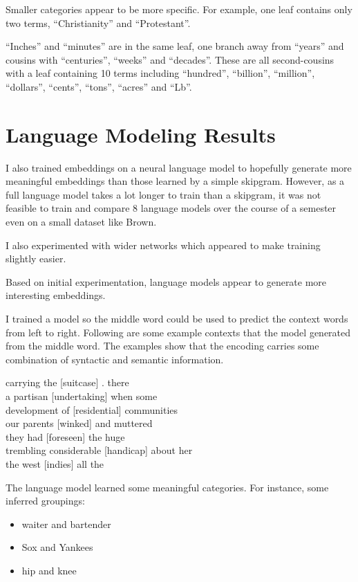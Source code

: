 \documentclass[sigconf]{acmart}
\begin{document}
Smaller categories appear to be more specific. For example, one leaf contains only two terms, ``Christianity'' and ``Protestant''. 

``Inches'' and ``minutes'' are in the same leaf, one branch away from ``years'' and cousins with ``centuries'', ``weeks'' and ``decades''. These are all second-cousins with a leaf containing 10 terms including ``hundred'', ``billion'', ``million'', ``dollars'', ``cents'', ``tons'', ``acres'' and ``Lb''.

\section{Language Modeling Results}

I also trained embeddings on a neural language model to hopefully generate more meaningful embeddings than those learned by a simple skipgram. However, as a full language model takes a lot longer to train than a skipgram, it was not feasible to train and compare 8 language models over the course of a semester even on a small dataset like Brown.

I also experimented with wider networks which appeared to make training slightly easier.

Based on initial experimentation, language models appear to generate more interesting embeddings.

I trained a model so the middle word could be used to predict the context words from left to right. Following are some example contexts that the model generated from the middle word. The examples show that the encoding carries some combination of syntactic and semantic information.

\begin{displayquote}
 carrying the [suitcase] . there \\
a partisan [undertaking] when some \\
development of [residential] communities \\
our parents [winked] and muttered \\
they had [foreseen] the huge \\
trembling considerable [handicap] about her \\
the west [indies] all the
\end{displayquote}

The language model learned some meaningful categories. For instance, some inferred groupings:
\begin{itemize}
\item waiter and bartender
\item Sox and Yankees
\item hip and knee
\end{itemize}
\end{document}
